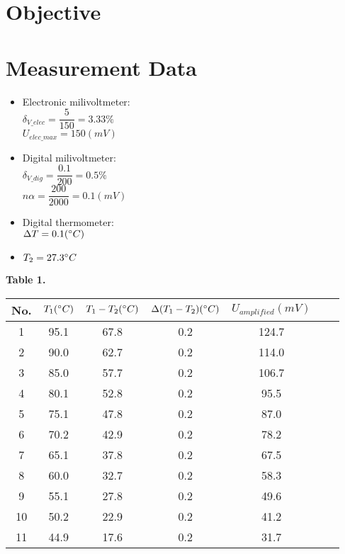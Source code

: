 \documentclass[12pt, a4paper]{article}
\newcommand{\Dt}{\Delta}
\newcommand{\hi}{\section}
\begin{document}
\pagebreak

\hi{Objective}

\hi{Measurement Data}
    \begin{itemize}
        \item Electronic milivoltmeter: \\
            $\delta_{V\_elec} = \dfrac{5}{150} = 3.33 \%$ \\
            $U_{elec\_max} = 150 (mV)$
        \item Digital milivoltmeter: \\
            $\delta_{V\_dig} = \dfrac{0.1}{200} = 0.5 \% $ \\
            $n\alpha = \dfrac{200}{2000} = 0.1 (mV)$
        \item Digital thermometer: \\
            $\Dt{T} = 0.1 (\degree C)$
        \item $T_{2} = 27.3 \degree C$
    \end{itemize}

    \begin{center}
        \textbf{Table 1.} \\ \vspace{5mm}
        \begin{tabular}{|c|c|c|c|c|c|c|}
            \hline
                \quad No. \quad &
                \quad $T_{1} (\degree C)$ \quad &
                \quad $T_{1} - T_{2} (\degree C)$ \quad &
                \quad $\Dt (T_{1} - T_{2}) (\degree C)$ \quad &
                \quad $U_{amplified} (mV)$ \quad \\
            \hline
            1       & 95.1 & 67.8 & 0.2 & 124.7 \\
            \hline
            2       & 90.0 & 62.7 & 0.2 & 114.0 \\
            \hline
            3       & 85.0 & 57.7 & 0.2 & 106.7 \\
            \hline
            4       & 80.1 & 52.8 & 0.2 &  95.5 \\
            \hline
            5       & 75.1 & 47.8 & 0.2 &  87.0 \\
            \hline
            6       & 70.2 & 42.9 & 0.2 &  78.2 \\
            \hline
            7       & 65.1 & 37.8 & 0.2 &  67.5 \\
            \hline
            8       & 60.0 & 32.7 & 0.2 &  58.3 \\
            \hline
            9       & 55.1 & 27.8 & 0.2 &  49.6 \\
            \hline
            10      & 50.2 & 22.9 & 0.2 &  41.2 \\
            \hline
            11      & 44.9 & 17.6 & 0.2 &  31.7 \\
            \hline
        \end{tabular}
    \end{center}
\end{document}
